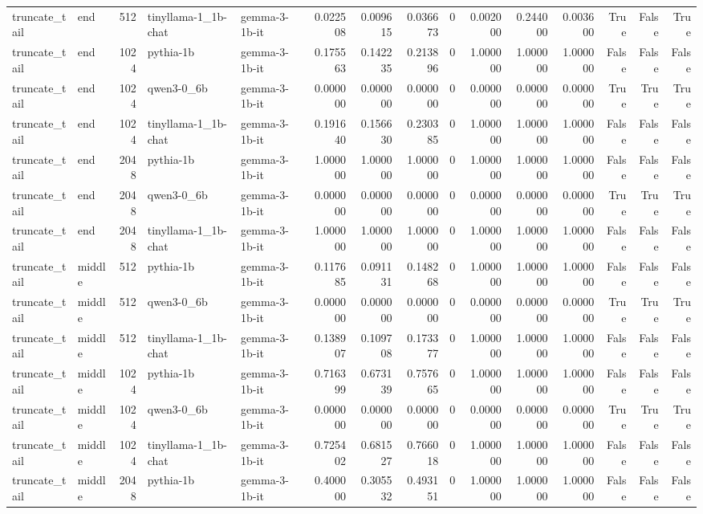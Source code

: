 \begin{tabular}{llrllrrrrrrrrrr}
truncate_tail & end & 512 & tinyllama-1_1b-chat & gemma-3-1b-it & 0.022508 & 0.009615 & 0.036673 & 0 & 0.002000 & 0.244000 & 0.003600 & True & False & True \\
truncate_tail & end & 1024 & pythia-1b & gemma-3-1b-it & 0.175563 & 0.142235 & 0.213896 & 0 & 1.000000 & 1.000000 & 1.000000 & False & False & False \\
truncate_tail & end & 1024 & qwen3-0_6b & gemma-3-1b-it & 0.000000 & 0.000000 & 0.000000 & 0 & 0.000000 & 0.000000 & 0.000000 & True & True & True \\
truncate_tail & end & 1024 & tinyllama-1_1b-chat & gemma-3-1b-it & 0.191640 & 0.156630 & 0.230385 & 0 & 1.000000 & 1.000000 & 1.000000 & False & False & False \\
truncate_tail & end & 2048 & pythia-1b & gemma-3-1b-it & 1.000000 & 1.000000 & 1.000000 & 0 & 1.000000 & 1.000000 & 1.000000 & False & False & False \\
truncate_tail & end & 2048 & qwen3-0_6b & gemma-3-1b-it & 0.000000 & 0.000000 & 0.000000 & 0 & 0.000000 & 0.000000 & 0.000000 & True & True & True \\
truncate_tail & end & 2048 & tinyllama-1_1b-chat & gemma-3-1b-it & 1.000000 & 1.000000 & 1.000000 & 0 & 1.000000 & 1.000000 & 1.000000 & False & False & False \\
truncate_tail & middle & 512 & pythia-1b & gemma-3-1b-it & 0.117685 & 0.091131 & 0.148268 & 0 & 1.000000 & 1.000000 & 1.000000 & False & False & False \\
truncate_tail & middle & 512 & qwen3-0_6b & gemma-3-1b-it & 0.000000 & 0.000000 & 0.000000 & 0 & 0.000000 & 0.000000 & 0.000000 & True & True & True \\
truncate_tail & middle & 512 & tinyllama-1_1b-chat & gemma-3-1b-it & 0.138907 & 0.109708 & 0.173377 & 0 & 1.000000 & 1.000000 & 1.000000 & False & False & False \\
truncate_tail & middle & 1024 & pythia-1b & gemma-3-1b-it & 0.716399 & 0.673139 & 0.757665 & 0 & 1.000000 & 1.000000 & 1.000000 & False & False & False \\
truncate_tail & middle & 1024 & qwen3-0_6b & gemma-3-1b-it & 0.000000 & 0.000000 & 0.000000 & 0 & 0.000000 & 0.000000 & 0.000000 & True & True & True \\
truncate_tail & middle & 1024 & tinyllama-1_1b-chat & gemma-3-1b-it & 0.725402 & 0.681527 & 0.766018 & 0 & 1.000000 & 1.000000 & 1.000000 & False & False & False \\
truncate_tail & middle & 2048 & pythia-1b & gemma-3-1b-it & 0.400000 & 0.305532 & 0.493151 & 0 & 1.000000 & 1.000000 & 1.000000 & False & False & False \\

\end{tabular}
